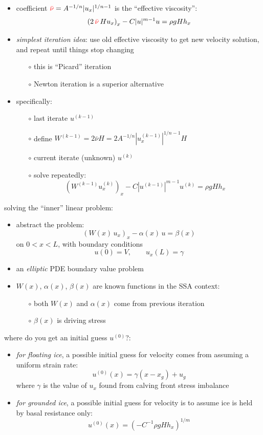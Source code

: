 \documentclass[titlepage,letterpaper,final,11pt]{scrartcl}
\begin{document}
\begin{itemize}
\item coefficient ${\color{red} \bar \nu} = A^{-1/n} |u_x|^{1/n-1}$ is the ``effective viscosity'':
   $$\left(2 \,{\color{red} \bar \nu}\, H u_x\right)_x - C |u|^{m-1} u = \rho g H h_x$$
\item \emph{simplest iteration idea}: use old effective viscosity to get new velocity solution, and repeat until things stop changing
  \begin{itemize}
  \item[$\circ$] this is ``Picard'' iteration
  \item[$\circ$] Newton iteration is a superior alternative
  \end{itemize}
\item specifically:
  \begin{itemize}
  \item[$\circ$] last iterate $u^{(k-1)}$
  \item[$\circ$] define $W^{(k-1)} = 2 \bar \nu H = 2 A^{-1/n} |u^{(k-1)}_x|^{1/n-1} H$
  \item[$\circ$] current iterate (unknown) $u^{(k)}$
  \item[$\circ$] solve repeatedly:
     $$\left(W^{(k-1)} u^{(k)}_x\right)_x - C |u^{(k-1)}|^{m-1} u^{(k)} = \rho g H h_x$$
  \end{itemize}
\end{itemize}

solving the ``inner'' linear problem:
\begin{itemize}
\item abstract the problem:
   $$\left(W(x)\, u_x\right)_x - \alpha(x)\, u = \beta(x)$$
on $0 < x < L$, with boundary conditions
   $$u(0) = V, \qquad  u_x(L) = \gamma$$
\item an \emph{elliptic} PDE boundary value problem
\item $W(x)$, $\alpha(x)$, $\beta(x)$ are known functions in the SSA context:
  \begin{itemize}
  \item[$\circ$] both $W(x)$ and $\alpha(x)$ come from previous iteration
  \item[$\circ$] $\beta(x)$ is driving stress
  \end{itemize}
\end{itemize}

where do you get an initial guess $u^{(0)}$?:

\begin{itemize}
\item \emph{for floating ice}, a possible initial guess for velocity comes from assuming a uniform strain rate:
   $$u^{(0)}(x) = \gamma (x-x_g) + u_g$$
where $\gamma$ is the value of $u_x$ found from calving front stress imbalance
\item \emph{for grounded ice}, a possible initial guess for velocity is to assume ice is held by basal resistance only:
   $$u^{(0)}(x) = \left(-C^{-1} \rho g H h_x\right)^{1/m}$$
\end{itemize}
\end{document}
